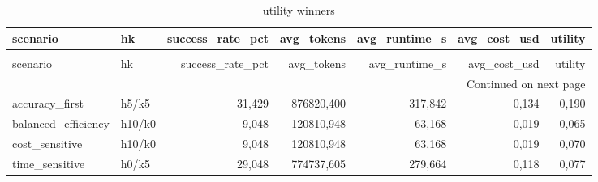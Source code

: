 \begin{longtable}{llrrrrr}
\caption{utility winners} \label{tab:utility_winners} \\
\toprule
scenario & hk & success\_rate\_pct & avg\_tokens & avg\_runtime\_s & avg\_cost\_usd & utility \\
\midrule
\endfirsthead
\caption[]{utility winners} \\
\toprule
scenario & hk & success\_rate\_pct & avg\_tokens & avg\_runtime\_s & avg\_cost\_usd & utility \\
\midrule
\endhead
\midrule
\multicolumn{7}{r}{Continued on next page} \\
\midrule
\endfoot
\bottomrule
\endlastfoot
accuracy\_first & h5/k5 & 31,429 & 876820,400 & 317,842 & 0,134 & 0,190 \\
balanced\_efficiency & h10/k0 & 9,048 & 120810,948 & 63,168 & 0,019 & 0,065 \\
cost\_sensitive & h10/k0 & 9,048 & 120810,948 & 63,168 & 0,019 & 0,070 \\
time\_sensitive & h0/k5 & 29,048 & 774737,605 & 279,664 & 0,118 & 0,077 \\
\end{longtable}
